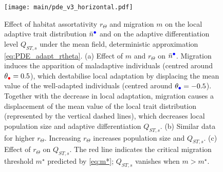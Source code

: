 \begin{figure}[ht]
  \centering
  \texttt{[image: main/pde\_v3\_horizontal.pdf]}
    \caption{\small Effect of habitat assortativity $r_\Theta$ and migration $m$ on the local adaptive trait distribution $\bar{n}^{\bcirc}$ and on the adaptive differentiation level $Q_{ST,s}$ under the mean field, deterministic approximation \cref{eq:PDE_adapt_rtheta}. (a) Effect of $m$ and $r_\Theta$ on $\bar{n}^{\bcirc}$. Migration induces the apparition of maladaptive individuals (centred around $\theta_{\rcirc} = 0.5$), which destabilise local adaptation by displacing the mean value of the well-adapted individuals (centred around $\theta_{\bcirc} = -0.5$). Together with the decrease in local adaptation, migration causes a displacement of the mean value of the local trait distribution (represented by the vertical dashed lines), which decreases local population size and adaptive differentiation $Q_{ST,s}$. (b) Similar data for higher $r_\Theta$. Increasing $r_\Theta$ increases population size and $Q_{ST,s}$. (c) Effect of $r_\Theta$ on $Q_{ST,s}$. The red line indicates the critical migration threshold $m^\star$ predicted by \cref{eq:m*}; $Q_{ST,s}$ vanishes when $m > m^\star$.}\label{fig:heatmap_betas_m_rtheta}
\end{figure}
\FloatBarrier

